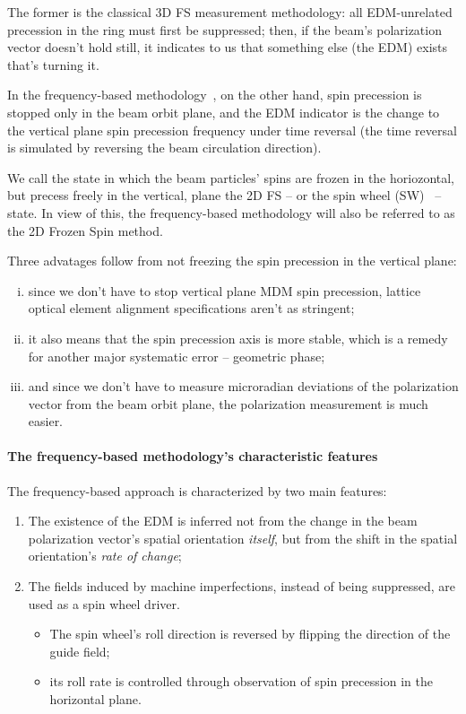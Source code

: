 \documentclass[preprint, review]{elsarticle}
\begin{document}
The former is the classical 3D FS measurement methodology: all EDM-unrelated precession in the ring
must first be suppressed; then, if the beam's polarization vector doesn't hold still,
it indicates to us that something else (the EDM) exists that's turning it.

In the frequency-based methodology~\cite{Senichev:FDM}, on the other hand, spin precession
is stopped only in the beam orbit plane,
and the EDM indicator is the change to the vertical plane spin precession frequency under time reversal
(the time reversal is simulated by reversing the beam circulation direction).

We call the state in which the beam particles' spins are frozen in the horiozontal,
but precess freely in the vertical, plane the 2D FS -- or the spin wheel (SW)~\cite{Mane:SpinWheel} -- state.
In view of this, the frequency-based methodology will also be referred to as the 2D Frozen Spin method.

Three advatages follow from not freezing the spin precession in the vertical plane:
\begin{enumerate}[(i)]
\item since we don't have to stop vertical plane MDM spin precession, lattice optical element alignment
  specifications aren't as stringent;
\item it also means that the spin precession axis is more stable, which is a remedy for another major
  systematic error -- geometric phase;\label{itm:advantages:stability}
\item and since we don't have to measure microradian deviations of the polarization vector from the
  beam orbit plane, the polarization measurement is much easier.
\end{enumerate}

\paragraph{The frequency-based methodology's characteristic features}

The frequency-based approach is characterized by two main features:
\begin{enumerate}
\item The existence of the EDM is inferred not from the change in the beam polarization vector's
  spatial orientation \emph{itself}, but from the shift in the spatial orientation's \emph{rate of change};
\item The fields induced by machine imperfections, instead of being suppressed,
  are used as a spin wheel driver.
  \begin{itemize}
  \item The spin wheel's roll direction is reversed by flipping the direction of the guide field;
  \item its roll rate is controlled through observation of spin precession in the horizontal plane.
  \end{itemize}
\end{enumerate}
\end{document}

